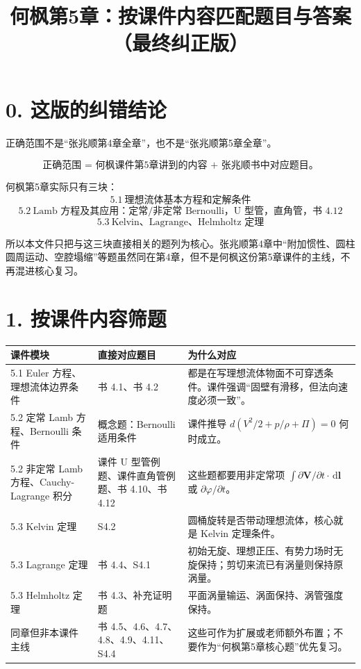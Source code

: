 \documentclass[UTF8,zihao=-4]{ctexart}
\title{\bfseries 何枫第5章：按课件内容匹配题目与答案（最终纠正版）}
\author{}
\date{}
\newcommand{\dd}{\,\mathrm d}
\newcommand{\core}[1]{\textcolor{blue!65!black}{#1}}
\begin{document}
\maketitle

\section*{0. 这版的纠错结论}

正确范围不是“张兆顺第4章全章”，也不是“张兆顺第5章全章”。

\[
\boxed{\text{正确范围 = 何枫课件第5章讲到的内容 + 张兆顺书中对应题目。}}
\]

何枫第5章实际只有三块：
\[
5.1\ \text{理想流体基本方程和定解条件}
\]
\[
5.2\ \text{Lamb 方程及其应用：定常/非定常 Bernoulli，U 型管，直角管，书 4.12}
\]
\[
5.3\ \text{Kelvin、Lagrange、Helmholtz 定理}
\]

所以本文件只把与这三块直接相关的题列为核心。张兆顺第4章中“附加惯性、圆柱圆周运动、空腔塌缩”等题虽然同在第4章，但不是何枫这份第5章课件的主线，不再混进核心复习。

\section*{1. 按课件内容筛题}

\begin{longtable}{p{3.2cm}p{5.2cm}p{6.6cm}}
\toprule
课件模块 & 直接对应题目 & 为什么对应 \\
\midrule
5.1 Euler 方程、理想流体边界条件 & \core{书 4.1、书 4.2} & 都是在写理想流体物面不可穿透条件。课件强调“固壁有滑移，但法向速度必须一致”。\\
5.2 定常 Lamb 方程、Bernoulli 条件 & \core{概念题：Bernoulli 适用条件} & 课件推导 \(d(V^2/2+p/\rho+\Pi)=0\) 何时成立。\\
5.2 非定常 Lamb 方程、Cauchy-Lagrange 积分 & \core{课件 U 型管例题、课件直角管例题、书 4.10、书 4.12} & 这些题都要用非定常项 \(\int \partial\bm V/\partial t\cdot \dd\bm l\) 或 \(\partial\varphi/\partial t\)。\\
5.3 Kelvin 定理 & \core{S4.2} & 圆桶旋转是否带动理想流体，核心就是 Kelvin 定理条件。\\
5.3 Lagrange 定理 & \core{书 4.4、S4.1} & 初始无旋、理想正压、有势力场时无旋保持；剪切来流已有涡量则保持原涡量。\\
5.3 Helmholtz 定理 & \core{书 4.3、补充证明题} & 平面涡量输运、涡面保持、涡管强度保持。\\
\midrule
同章但非本课件主线 & 书 4.5、4.6、4.7、4.8、4.9、4.11、S4.4 & 这些可作为扩展或老师额外布置；不要作为“何枫第5章核心题”优先复习。\\
\bottomrule
\end{longtable}
\end{document}
